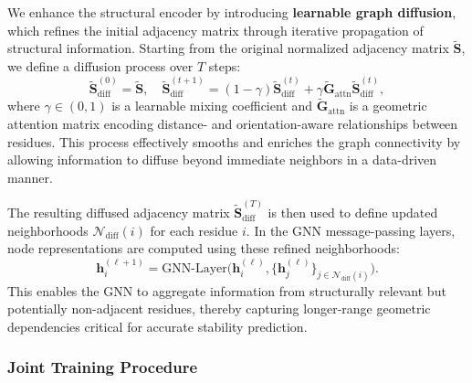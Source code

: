\documentclass[11pt]{article}
\begin{document}
We enhance the structural encoder by introducing \textbf{learnable graph diffusion}, which refines the initial adjacency matrix through iterative propagation of structural information. Starting from the original normalized adjacency matrix $\mathbf{\tilde{S}}$, we define a diffusion process over $T$ steps:
\begin{equation}
    \mathbf{\tilde{S}}_{\text{diff}}^{(0)} = \mathbf{\tilde{S}}, \quad
    \mathbf{\tilde{S}}_{\text{diff}}^{(t+1)} = (1 - \gamma) \mathbf{\tilde{S}}_{\text{diff}}^{(t)} + \gamma \mathbf{\tilde{G}}_{\text{attn}} \mathbf{\tilde{S}}_{\text{diff}}^{(t)},
\end{equation}
where $\gamma \in (0,1)$ is a learnable mixing coefficient and $\mathbf{\tilde{G}}_{\text{attn}}$ is a geometric attention matrix encoding distance- and orientation-aware relationships between residues. This process effectively smooths and enriches the graph connectivity by allowing information to diffuse beyond immediate neighbors in a data-driven manner.

The resulting diffused adjacency matrix $\mathbf{\tilde{S}}_{\text{diff}}^{(T)}$ is then used to define updated neighborhoods $\mathcal{N}_{\text{diff}}(i)$ for each residue $i$. In the GNN message-passing layers, node representations are computed using these refined neighborhoods:
\begin{equation}
    \mathbf{h}_i^{(\ell+1)} = \text{GNN-Layer}\big(\mathbf{h}_i^{(\ell)}, \{\mathbf{h}_j^{(\ell)}\}_{j \in \mathcal{N}_{\text{diff}}(i)}\big).
\end{equation}
This enables the GNN to aggregate information from structurally relevant but potentially non-adjacent residues, thereby capturing longer-range geometric dependencies critical for accurate stability prediction.








\subsubsection{Joint Training Procedure}
\end{document}
